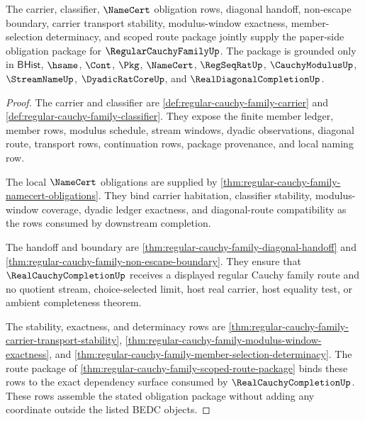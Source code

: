 \begin{theorem}
\label{thm:regular-cauchy-family-obligation-closure-package}
The carrier, classifier, $\NameCert$ obligation rows, diagonal handoff, non-escape boundary, carrier transport stability, modulus-window exactness, member-selection determinacy, and scoped route package jointly supply the paper-side obligation package for $\RegularCauchyFamilyUp$. The package is grounded only in $\mathsf{BHist}$, $\hsame$, $\Cont$, $\Pkg$, $\NameCert$, $\RegSeqRatUp$, $\CauchyModulusUp$, $\StreamNameUp$, $\DyadicRatCoreUp$, and $\RealDiagonalCompletionUp$.
\end{theorem}
\begin{proof}
The carrier and classifier are \autoref{def:regular-cauchy-family-carrier} and \autoref{def:regular-cauchy-family-classifier}. They expose the finite member ledger, member rows, modulus schedule, stream windows, dyadic observations, diagonal route, transport rows, continuation rows, package provenance, and local naming row.

The local $\NameCert$ obligations are supplied by \autoref{thm:regular-cauchy-family-namecert-obligations}. They bind carrier habitation, classifier stability, modulus-window coverage, dyadic ledger exactness, and diagonal-route compatibility as the rows consumed by downstream completion.

The handoff and boundary are \autoref{thm:regular-cauchy-family-diagonal-handoff} and \autoref{thm:regular-cauchy-family-non-escape-boundary}. They ensure that $\RealCauchyCompletionUp$ receives a displayed regular Cauchy family route and no quotient stream, choice-selected limit, host real carrier, host equality test, or ambient completeness theorem.

The stability, exactness, and determinacy rows are \autoref{thm:regular-cauchy-family-carrier-transport-stability}, \autoref{thm:regular-cauchy-family-modulus-window-exactness}, and \autoref{thm:regular-cauchy-family-member-selection-determinacy}. The route package of \autoref{thm:regular-cauchy-family-scoped-route-package} binds these rows to the exact dependency surface consumed by $\RealCauchyCompletionUp$. These rows assemble the stated obligation package without adding any coordinate outside the listed BEDC objects.
\end{proof}

